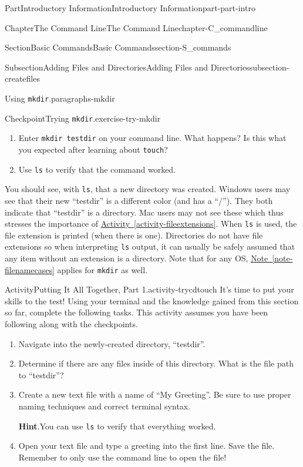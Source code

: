 \documentclass[oneside,10pt,]{book}
\newcommand{\blocktitlefont}{\relax}
\newcommand{\xreffont}{\relax}
\newcommand{\mono}[1]{\texttt{#1}}
\begin{document}
\begin{partptx}{Part}{Introductory Information}{}{Introductory Information}{}{}{part-part-intro}
\begin{chapterptx}{Chapter}{The Command Line}{}{The Command Line}{}{}{chapter-C_commandline}
\begin{sectionptx}{Section}{Basic Commands}{}{Basic Commands}{}{}{section-S_commands}
\begin{subsectionptx}{Subsection}{Adding Files and Directories}{}{Adding Files and Directories}{}{}{subsection-createfiles}
\begin{paragraphs}{Using \mono{mkdir}.}{paragraphs-mkdir}
\begin{inlineexercise}{Checkpoint}{Trying \mono{mkdir}.}{exercise-try-mkdir}%
\begin{enumerate}[font=\bfseries,label=(\alph*),ref=\alph*]%
\item{}Enter \mono{mkdir testdir} on your command line. What happens? Is this what you expected after learning about \mono{touch}?%
\item{}Use \mono{ls} to verify that the command worked.%
\end{enumerate}%
\end{inlineexercise}%
You should see, with \mono{ls}, that a new directory was created. Windows users may see that their new ``testdir'' is a different color (and has a ``\slash{}''). They both indicate that ``testdir'' is a directory. Mac users may not see these which thus stresses the importance of \hyperref[activity-fileextensions]{Activity~{\xreffont\ref{activity-fileextensions}}}. When \mono{ls} is used, the file extension is printed (when there is one). Directories do not have file extensions so when interpreting \mono{ls} output, it can usually be safely assumed that any item without an extension is a directory. Note that for any OS, \hyperref[note-filenamecases]{Note~{\xreffont\ref{note-filenamecases}}} applies for \mono{mkdir} as well.%
\end{paragraphs}%
\begin{activity}{Activity}{Putting It All Together, Part 1.}{activity-trycdtouch}%
%
It's time to put your skills to the test! Using your terminal and the knowledge gained from this section so far, complete the following tasks. This activity assumes you have been following along with the checkpoints.%
\begin{enumerate}[font=\bfseries,label=(\alph*),ref=\alph*]%
\item{}Navigate into the newly-created directory, ``testdir''.%
\item{}Determine if there are any files inside of this directory. What is the file path to ``testdir''?%
\item{}Create a new text file with a name of ``My Greeting''. Be sure to use proper naming techniques and correct terminal syntax.%
\par\smallskip%
\noindent\textbf{\blocktitlefont Hint}.\hypertarget{hint-trycdtouch-f-b}{}\quad{}You can use \mono{ls} to verify that everything worked.%
\item{}Open your text file and type a greeting into the first line. Save the file. Remember to only use the command line to open the file!%

\end{enumerate}
\end{activity}
\end{subsectionptx}
\end{sectionptx}
\end{chapterptx}
\end{partptx}
\end{document}
